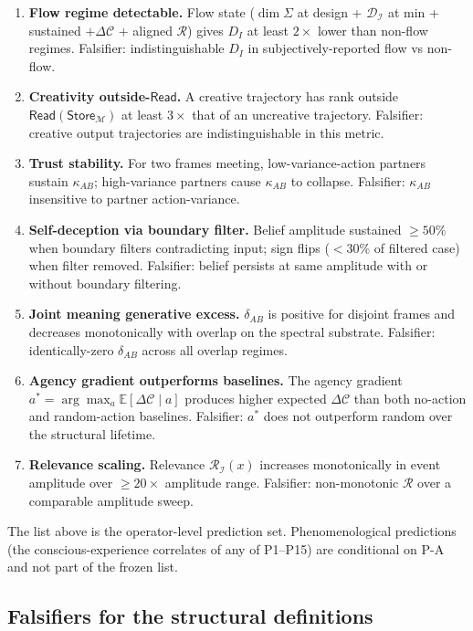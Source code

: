 \documentclass[11pt]{article}
\theoremstyle{plain}
\theoremstyle{definition}
\theoremstyle{remark}
\newcommand{\Ical}{\mathcal{I}}
\newcommand{\Ccal}{\mathcal{C}}
\newcommand{\Mcal}{\mathcal{M}}
\newcommand{\Rcal}{\mathcal{R}}
\newcommand{\Dcal}{\mathcal{D}}
\begin{document}
\begin{enumerate}[leftmargin=2em, label=\textbf{P\arabic*.}]
\item \textbf{Flow regime detectable.} Flow state ($\dim \Sigma$ at design + $\Dcal_\Ical$ at min + sustained $+\Delta\Ccal$ + aligned $\Rcal$) gives $D_I$ at least $2 \times$ lower than non-flow regimes. Falsifier: indistinguishable $D_I$ in subjectively-reported flow vs non-flow.
\item \textbf{Creativity outside-$\mathsf{Read}$.} A creative trajectory has rank outside $\mathsf{Read}(\mathsf{Store}_\Mcal)$ at least $3 \times$ that of an uncreative trajectory. Falsifier: creative output trajectories are indistinguishable in this metric.
\item \textbf{Trust stability.} For two frames meeting, low-variance-action partners sustain $\kappa_{AB}$; high-variance partners cause $\kappa_{AB}$ to collapse. Falsifier: $\kappa_{AB}$ insensitive to partner action-variance.
\item \textbf{Self-deception via boundary filter.} Belief amplitude sustained $\geq 50\%$ when boundary filters contradicting input; sign flips ($< 30\%$ of filtered case) when filter removed. Falsifier: belief persists at same amplitude with or without boundary filtering.
\item \textbf{Joint meaning generative excess.} $\delta_{AB}$ is positive for disjoint frames and decreases monotonically with overlap on the spectral substrate. Falsifier: identically-zero $\delta_{AB}$ across all overlap regimes.
\item \textbf{Agency gradient outperforms baselines.} The agency gradient $a^* = \arg\max_a \mathbb{E}[\Delta\Ccal \mid a]$ produces higher expected $\Delta\Ccal$ than both no-action and random-action baselines. Falsifier: $a^*$ does not outperform random over the structural lifetime.
\item \textbf{Relevance scaling.} Relevance $\Rcal_\Ical(x)$ increases monotonically in event amplitude over $\geq 20 \times$ amplitude range. Falsifier: non-monotonic $\Rcal$ over a comparable amplitude sweep.
\end{enumerate}

The list above is the operator-level prediction set. Phenomenological predictions (the conscious-experience correlates of any of P1--P15) are conditional on P-A and not part of the frozen list.

\subsection{Falsifiers for the structural definitions}
\end{document}
